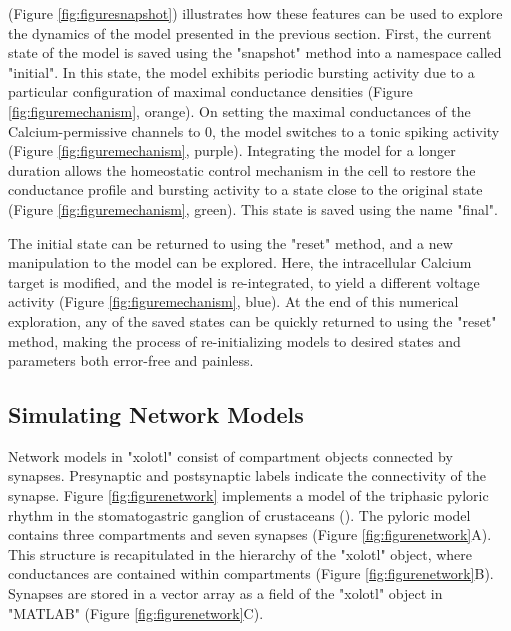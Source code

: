 \documentclass{frontiersSCNS} %
\begin{document}
(Figure \ref{fig:figuresnapshot}) illustrates how these features can be used to explore the dynamics of the model presented in the previous section. First, the current state of the model is saved using the "snapshot" method into a namespace called "initial". In this state, the model exhibits periodic bursting activity due to a particular configuration of maximal conductance densities (Figure \ref{fig:figuremechanism}, orange).  On setting the maximal conductances of the Calcium-permissive channels to 0, the model switches to a tonic spiking activity (Figure \ref{fig:figuremechanism}, purple). Integrating the model for a longer duration allows the homeostatic control mechanism in the cell to restore the conductance profile and bursting activity to a state close to the original state (Figure \ref{fig:figuremechanism}, green). This state is saved using the name "final".

The initial state can be returned to using the "reset" method, and a new manipulation to the model can be explored. Here, the intracellular Calcium target is modified, and the model is re-integrated, to yield a different voltage activity (Figure \ref{fig:figuremechanism}, blue). At the end of this numerical exploration, any of the saved states can be quickly returned to using the "reset" method, making the process of re-initializing models to desired states and parameters both error-free and painless. 




%
%
%
%
%
%



\subsection{Simulating Network Models}



Network models in "xolotl" consist of compartment objects connected by synapses. Presynaptic and postsynaptic labels indicate the connectivity of the synapse. Figure \ref{fig:figurenetwork} implements a model of the triphasic pyloric rhythm in the stomatogastric ganglion of crustaceans (\cite{prinzSimilarNetworkActivity2004}). The pyloric model contains three compartments and seven synapses (Figure \ref{fig:figurenetwork}A). This structure is recapitulated in the hierarchy of the "xolotl" object, where conductances are contained within compartments (Figure \ref{fig:figurenetwork}B). Synapses are stored in a vector array as a field of the "xolotl" object in "MATLAB" (Figure \ref{fig:figurenetwork}C).
\end{document}
